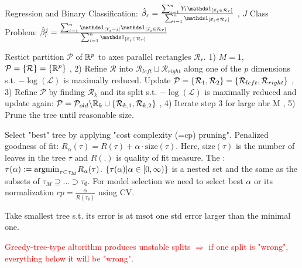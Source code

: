 \vspace{5pt}

 Regression and Binary Classification: $\hat{\beta}_r = \frac{\sum_{i=1}^n Y_i \id_{[\vec{x}_i \in \mathcal{R}_r]}}{\sum_{i=1}^n \id_{[\vec{x}_i \in \mathcal{R}_r]}}$ , $J$ Class Problem: $\hat{\beta}_r^{j} = \frac{\sum_{i=1}^n \id_{[Y_i =  j]} \id_{[\vec{x}_i \in \mathcal{R}_r]}}{\sum_{i=1}^n \id_{[\vec{x}_i \in \mathcal{R}_r]}}$

\vspace{5pt}

 Restict partition $\mathcal{P}$ of $\mathbb{R}^p$ to axes parallel rectangles $\mathcal{R}_r$. 1) $M=1$, $\mathcal{P} = \left\{ \mathcal{R} \right\} = \left\{ \mathbb{R}^p \right\}$ , 2) Refine $\mathcal{R}$ into $\mathcal{R}_{left} \sqcup \mathcal{R}_{right}$ along one of the $p$ dimensions s.t. $-\log(\mathcal{L})$ is maximally reduced. Update $\mathcal{P} = \left\{ \mathcal{R}_1,\mathcal{R}_2 \right\} = \left\{ \mathcal{R}_{left},\mathcal{R}_{right} \right\}$ , 3) Refine $\mathcal{P}$ by finding $\mathcal{R}_k$ and its split s.t. $-\log(\mathcal{L})$ is maximally reduced and update again: $\mathcal{P} = \mathcal{P}_{old} \backslash \mathbb{R}_{k} \cup \left\{ \mathcal{R}_{k,1},\mathcal{R}_{k,2} \right\}$ , 4) Iterate step 3 for large nbr M , 5) Prune the tree until reasonable size.

\vspace{5pt}

Select "best" tree by applying "cost complexity (=cp) pruning". Penalized goodness of fit: $R_\alpha (\tau) = R(\tau) + \alpha \cdot \text{size}(\tau)$. Here, size$(\tau)$ is the number of leaves in the tree $\tau$ and $R(.)$ is quality of fit measure. The : $\tau (\alpha) := \text{argmin}_{\tau \subset \tau_M} R_{\alpha} (\tau)$. $\left\{ \tau(\alpha) | \alpha \in [0,\infty) \right\}$ is a nested set and the same as the subsets of $\tau_M \supseteq \dots \supset \tau_{\emptyset}$. For model selection we need to select best $\alpha$ or its normalization $cp = \frac{\alpha}{R(\tau_{\emptyset})}$ using CV.

\vspace{5pt}

Take smallest tree s.t. its error is at msot one std error larger than the minimal one.

\vspace{5pt}

\textcolor{red}{Greedy-tree-type altorithm produces unstable splits $\Rightarrow$ if one split is "wrong", everything below it will be "wrong".}

